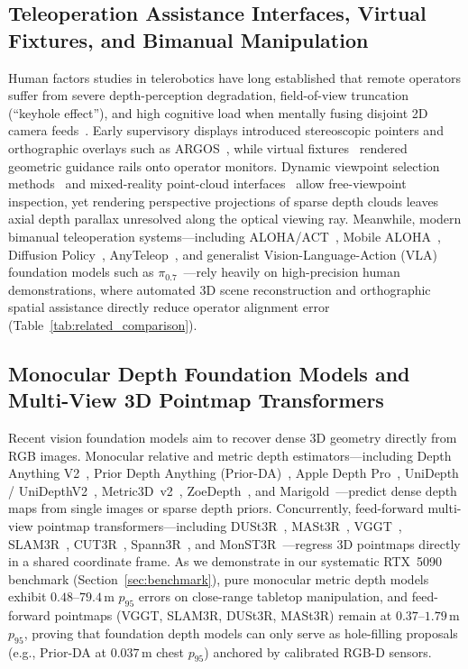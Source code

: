 \documentclass[10pt,journal]{IEEEtran}
\begin{document}
\subsection{Teleoperation Assistance Interfaces, Virtual Fixtures, and Bimanual Manipulation}
Human factors studies in telerobotics have long established that remote operators suffer from severe depth-perception degradation, field-of-view truncation (``keyhole effect''), and high cognitive load when mentally fusing disjoint 2D camera feeds~\cite{chen2007human,rea2022still,billard2019trends,sheridan1992telerobotics}. Early supervisory displays introduced stereoscopic pointers and orthographic overlays such as ARGOS~\cite{milgram1993argos}, while virtual fixtures~\cite{rosenberg1993virtual,bowyer2013active} rendered geometric guidance rails onto operator monitors. Dynamic viewpoint selection methods~\cite{rakita2018autonomous} and mixed-reality point-cloud interfaces~\cite{su2021mixed,schwarz2017nimbro} allow free-viewpoint inspection, yet rendering perspective projections of sparse depth clouds leaves axial depth parallax unresolved along the optical viewing ray. Meanwhile, modern bimanual teleoperation systems---including ALOHA/ACT~\cite{zhao2023learning}, Mobile ALOHA~\cite{fu2024mobile}, Diffusion Policy~\cite{chi2023diffusion}, AnyTeleop~\cite{qin2023anyteleop}, and generalist Vision-Language-Action (VLA) foundation models such as $\pi_{0.7}$~\cite{pi2026pi07}---rely heavily on high-precision human demonstrations, where automated 3D scene reconstruction and orthographic spatial assistance directly reduce operator alignment error (Table~\ref{tab:related_comparison}).

\subsection{Monocular Depth Foundation Models and Multi-View 3D Pointmap Transformers}
Recent vision foundation models aim to recover dense 3D geometry directly from RGB images. Monocular relative and metric depth estimators---including Depth Anything V2~\cite{yang2024depthv2}, Prior Depth Anything (Prior-DA)~\cite{wang2025priorda}, Apple Depth Pro~\cite{bochkovskii2025depthpro}, UniDepth / UniDepthV2~\cite{piccinelli2024unidepth,piccinelli2025unidepthv2}, Metric3D~v2~\cite{hu2024metric3dv2}, ZoeDepth~\cite{bhat2023zoedepth}, and Marigold~\cite{ke2024marigold}---predict dense depth maps from single images or sparse depth priors. Concurrently, feed-forward multi-view pointmap transformers---including DUSt3R~\cite{wang2024dust3r}, MASt3R~\cite{leroy2024mast3r}, VGGT~\cite{wang2025vggt}, SLAM3R~\cite{liu2025slam3r}, CUT3R~\cite{wang2025cut3r}, Spann3R~\cite{wang2025spann3r}, and MonST3R~\cite{zhang2025monst3r}---regress 3D pointmaps directly in a shared coordinate frame. As we demonstrate in our systematic RTX~5090 benchmark (Section~\ref{sec:benchmark}), pure monocular metric depth models exhibit $0.48$--$79.4\,\mathrm{m}$ $p_{95}$ errors on close-range tabletop manipulation, and feed-forward pointmaps (VGGT, SLAM3R, DUSt3R, MASt3R) remain at $0.37$--$1.79\,\mathrm{m}$ $p_{95}$, proving that foundation depth models can only serve as hole-filling proposals (e.g., Prior-DA at $0.037\,\mathrm{m}$ chest $p_{95}$) anchored by calibrated RGB-D sensors.
\end{document}

